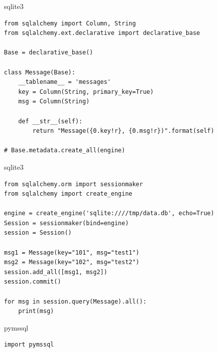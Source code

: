 \documentclass{article}
\begin{document}
\begin{center} sqlite3 \end{center}
\begin{lstlisting}
from sqlalchemy import Column, String
from sqlalchemy.ext.declarative import declarative_base

Base = declarative_base()

class Message(Base):
    __tablename__ = 'messages'
    key = Column(String, primary_key=True)
    msg = Column(String)

    def __str__(self):
        return "Message({0.key!r}, {0.msg!r})".format(self)

# Base.metadata.create_all(engine)
\end{lstlisting}
\newpage


\begin{center} sqlite3 \end{center}
\begin{lstlisting}
from sqlalchemy.orm import sessionmaker
from sqlalchemy import create_engine

engine = create_engine('sqlite:////tmp/data.db', echo=True)
Session = sessionmaker(bind=engine)
session = Session()

msg1 = Message(key="101", msg="test1")
msg2 = Message(key="102", msg="test2")
session.add_all([msg1, msg2])
session.commit()

for msg in session.query(Message).all():
    print(msg) 
\end{lstlisting}
\newpage

\begin{center} pymssql \end{center}
\begin{lstlisting}
import pymssql
\end{lstlisting}
\newpage
\end{document}
